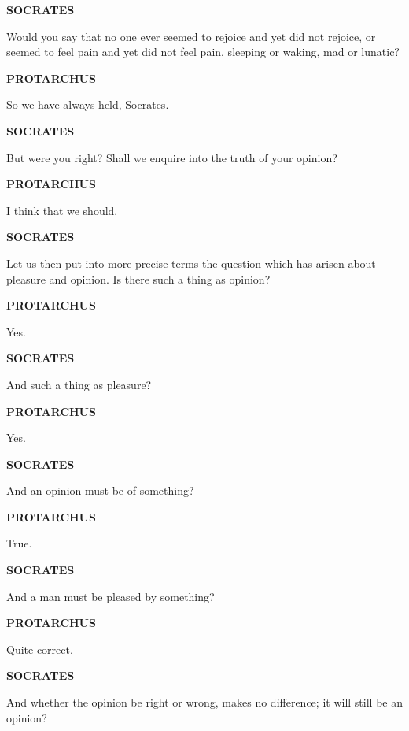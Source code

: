 \documentclass[11pt,letter]{article}
\begin{document}
\par \textbf{SOCRATES}
\par   Would you say that no one ever seemed to rejoice and yet did not rejoice, or seemed to feel pain and yet did not feel pain, sleeping or waking, mad or lunatic?

\par \textbf{PROTARCHUS}
\par   So we have always held, Socrates.

\par \textbf{SOCRATES}
\par   But were you right? Shall we enquire into the truth of your opinion?

\par \textbf{PROTARCHUS}
\par   I think that we should.

\par \textbf{SOCRATES}
\par   Let us then put into more precise terms the question which has arisen about pleasure and opinion. Is there such a thing as opinion?

\par \textbf{PROTARCHUS}
\par   Yes.

\par \textbf{SOCRATES}
\par   And such a thing as pleasure?

\par \textbf{PROTARCHUS}
\par   Yes.

\par \textbf{SOCRATES}
\par   And an opinion must be of something?

\par \textbf{PROTARCHUS}
\par   True.

\par \textbf{SOCRATES}
\par   And a man must be pleased by something?

\par \textbf{PROTARCHUS}
\par   Quite correct.

\par \textbf{SOCRATES}
\par   And whether the opinion be right or wrong, makes no difference; it will still be an opinion?
\end{document}
